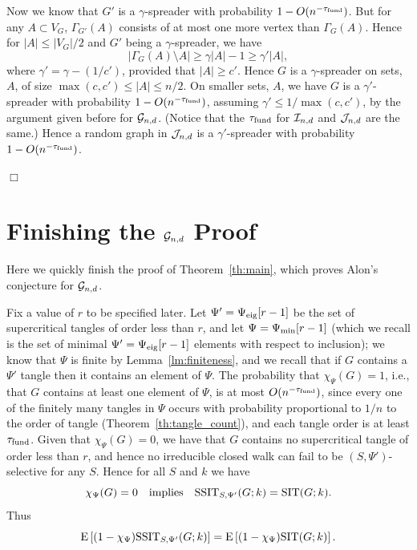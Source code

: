 \documentclass[12pt]{article}
\newcommand{\cg}{{\cal G}}
\newcommand{\ci}{{\cal I}}
\newcommand{\cj}{{\cal J}}
\newcommand{\cjnd}{\cj_{n,d}}
\newcommand{\cind}{\ci_{n,d}}
\newcommand{\cgnd}{\cg_{n,d}}
\newcommand{\fund}{{\rm fund}}
\newcommand{\taufund}{{\tau_\fund}}
\newcommand{\tset}{{\Psi}}
\newcommand{\tseig}{{\tset_{\rm eig}}}
\newcommand{\tsmin}{{\tset_{\rm min}}}
\newcommand{\sit}{{\rm SIT}}
\newcommand{\ssit}{{\rm SSIT}}
\newcommand{\E}[1]{\mbox{E}\left[#1\right] }
\newcommand{\proofbox}{\begin{flushright}$\Box$\end{flushright}}
\begin{document}
Now we know that $G'$ is a $\gamma$-spreader with probability
$1-O(n^{-\taufund})$.  But for any $A\subset V_G$, $\Gamma_{G'}(A)$
consists of at most one more vertex than $\Gamma_G(A)$.  Hence
for $|A|\le |V_G|/2$ and $G'$ being a $\gamma$-spreader, we have
$$
|\Gamma_G(A)\setminus A| \ge \gamma|A|-1 \ge \gamma'|A|,
$$
where $\gamma'=\gamma-(1/c')$, provided that $|A|\ge c'$.  Hence $G$
is a $\gamma$-spreader on sets, $A$, of size $\max(c,c')\le |A|\le n/2$.
On smaller sets, $A$, we have $G$ is a $\gamma'$-spreader with probability
$1-O(n^{-\taufund})$, assuming $\gamma'\le 1/\max(c,c')$, by the
argument given before for $\cgnd$.  (Notice that the $\taufund$
for $\cind$ and $\cjnd$ are the same.)  Hence a random graph in $\cjnd$ is a
$\gamma'$-spreader with probability $1-O(n^{-\taufund})$.
\proofbox

\section{Finishing the $\cgnd$ Proof}

Here we quickly finish the proof of Theorem~\ref{th:main}, which
proves Alon's conjecture for $\cgnd$.

Fix a value of $r$ to
be specified later.
Let $\tset'=\tseig[r-1]$ be the set of supercritical tangles of order less
than $r$,
and let
$\tset=\tsmin[r-1]$ (which we recall is the set of minimal $\tset'=
\tseig[r-1]$ elements with respect to inclusion);
we know that $\tset$ is finite by
Lemma~\ref{lm:finiteness}, and we recall that if $G$ contains a
$\tset'$ tangle then it contains an element of $\tset$.
The probability that $\chi_\tset(G)=1$, i.e., that
$G$ contains at least
one element of $\tset$, is at most $O(n^{-\taufund})$, since 
every one of the finitely many tangles in $\tset$ occurs with probability
proportional to $1/n$ to the order of tangle
(Theorem~\ref{th:tangle_count}), and each tangle order is
at least $\taufund$.  Given that $\chi_\tset(G)=0$, we have that $G$
contains no supercritical tangle of order less than
$r$, and hence no irreducible
closed walk
can fail to
be $(S,\tset')$-selective for any $S$.  Hence for all $S$ and $k$ we have
$$
\chi_\tset(G)=0 \quad\mbox{implies} \quad\ssit_{S,\tset'}(G;k)=\sit(G;k).
$$
Thus
$$
\E{ (1-\chi_\tset)\ssit_{S,\tset'}(G;k)} =
\E{ (1-\chi_\tset) \sit(G;k)}.
$$
\end{document}
